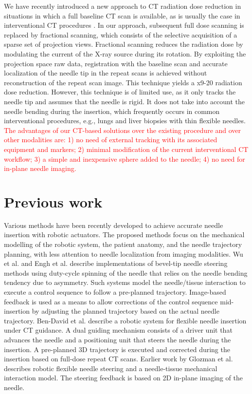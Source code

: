 We have recently introduced a new approach to CT radiation dose reduction in situations in which a full baseline CT scan is available, as is usually the case in interventional CT procedures \cite{medan2017sparse, medan2017reduced}. In our approach, subsequent full dose scanning is replaced by fractional scanning, which consists of the selective acquisition of a sparse set of projection views. Fractional scanning reduces the radiation dose by modulating the current of the X-ray source during its rotation. By exploiting the projection space raw data, registration with the baseline scan and accurate localization of the needle tip in the repeat scans is achieved without reconstruction of the repeat scan  image. This technique yields a x9-20 radiation dose reduction. However, this technique is of limited use, as it only tracks the needle tip and assumes that the needle is rigid. It does not take into account the needle bending during the insertion, which frequently occurs in common interventional procedures, e.g., lungs and liver biopsies with thin flexible needles. \textcolor{red}{The advantages of our CT-based solutions over the existing procedure and over other modalities are: 1) no need of external tracking with its associated equipment and markers; 2) minimal modification of the current interventional CT workflow; 3) a simple and inexpensive sphere added to the needle; 4) no need for in-plane needle imaging.}

\section*{Previous work}
Various methods have been recently developed to achieve accurate needle insertion with robotic actuators. The proposed methods focus on the mechanical modelling of the robotic system, the patient anatomy, and the needle trajectory planning, with less attention to needle localization from imaging modalities.
Wu et al. \cite{wu2013automatic} and Engh et al. \cite{engh2010percutaneous} describe implementations of bevel-tip needle steering methods using duty-cycle spinning of the needle that relies on the needle bending tendency due to asymmetry. Such systems model the needle/tissue interaction to execute a control sequence to follow a pre-planned trajectory. Image-based feedback is used as a means to allow corrections of the control sequence mid-insertion by adjusting the planned trajectory based on the actual needle trajectory.
Ben-David et al. \cite{ben2018robotic} describe a robotic system for flexible needle insertion under CT guidance. A dual guiding mechanism consists of a driver unit that advances the needle and a positioning unit that steers the needle during the insertion. A pre-planned 3D trajectory is executed and corrected during the insertion based on full-dose repeat CT scans.
Earlier work by Glozman et al. \cite{glozman2007image} describes robotic flexible needle steering and a needle-tissue mechanical interaction model. The steering feedback is based on 2D in-plane imaging of the needle.

